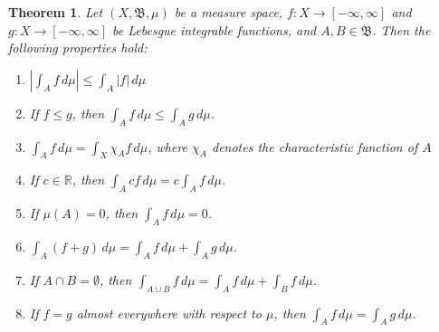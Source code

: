 \documentclass[12pt]{article}
\newtheorem*{thm*}{Theorem}
\begin{document}
\begin{thm*}
Let $(X, \mathfrak{B}, \mu)$ be a measure space, $f \colon X \to [-\infty,\infty]$ and $g \colon X \to [-\infty,\infty]$ be Lebesgue integrable functions, and $A,B \in \mathfrak{B}$. Then the following properties hold:

\begin{enumerate}
\item $\displaystyle \left| \int_A f \, d\mu \right| \le \int_A |f| \, d\mu$

\item If $f \le g$, then $\displaystyle \int_A f \, d\mu \le \int_A g \, d\mu$.

\item $\displaystyle \int_A f \, d\mu =\int_X \chi_A f \, d\mu$, where $\chi_A$ denotes the characteristic function of $A$

\item If $c \in \mathbb{R}$, then $\displaystyle \int_A cf \, d\mu =c\int_A f \, d\mu$.

\item If $\mu(A)=0$, then $\displaystyle \int_A f \, d\mu =0$.

\item $\displaystyle \int_A (f+g) \, d\mu =\int_A f \, d\mu +\int_A g \, d\mu$.

\item If $A \cap B=\emptyset$, then $\displaystyle \int_{A \cup B} f \, d\mu =\int_A f \, d\mu +\int_B f \, d\mu$.

\item If $f=g$ almost everywhere with respect to $\mu$, then $\displaystyle \int_A f \, d\mu =\int_A g \, d\mu$.

\end{enumerate}
\end{thm*}
\end{document}
